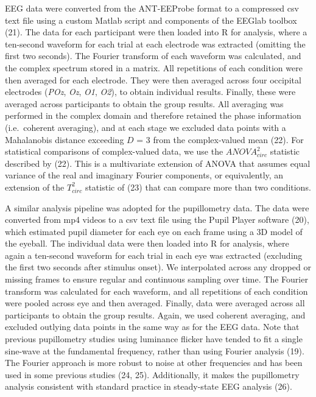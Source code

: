 \documentclass[
]{article}
\begin{document}
EEG data were converted from the ANT-EEProbe format to a compressed csv text file using a custom Matlab script and components of the EEGlab toolbox (21). The data for each participant were then loaded into R for analysis, where a ten-second waveform for each trial at each electrode was extracted (omitting the first two seconds). The Fourier transform of each waveform was calculated, and the complex spectrum stored in a matrix. All repetitions of each condition were then averaged for each electrode. They were then averaged across four occipital electrodes (\emph{POz}, \emph{Oz}, \emph{O1}, \emph{O2}), to obtain individual results. Finally, these were averaged across participants to obtain the group results. All averaging was performed in the complex domain and therefore retained the phase information (i.e.~coherent averaging), and at each stage we excluded data points with a Mahalanobis distance exceeding \(D\) = 3 from the complex-valued mean (22). For statistical comparisons of complex-valued data, we use the \(ANOVA^2_{circ}\) statistic described by (22). This is a multivariate extension of ANOVA that assumes equal variance of the real and imaginary Fourier components, or equivalently, an extension of the \(T^2_{circ}\) statistic of (23) that can compare more than two conditions.

A similar analysis pipeline was adopted for the pupillometry data. The data were converted from mp4 videos to a csv text file using the Pupil Player software (20), which estimated pupil diameter for each eye on each frame using a 3D model of the eyeball. The individual data were then loaded into R for analysis, where again a ten-second waveform for each trial in each eye was extracted (excluding the first two seconds after stimulus onset). We interpolated across any dropped or missing frames to ensure regular and continuous sampling over time. The Fourier transform was calculated for each waveform, and all repetitions of each condition were pooled across eye and then averaged. Finally, data were averaged across all participants to obtain the group results. Again, we used coherent averaging, and excluded outlying data points in the same way as for the EEG data. Note that previous pupillometry studies using luminance flicker have tended to fit a single sine-wave at the fundamental frequency, rather than using Fourier analysis (19). The Fourier approach is more robust to noise at other frequencies and has been used in some previous studies (24, 25). Additionally, it makes the pupillometry analysis consistent with standard practice in steady-state EEG analysis (26).
\end{document}
